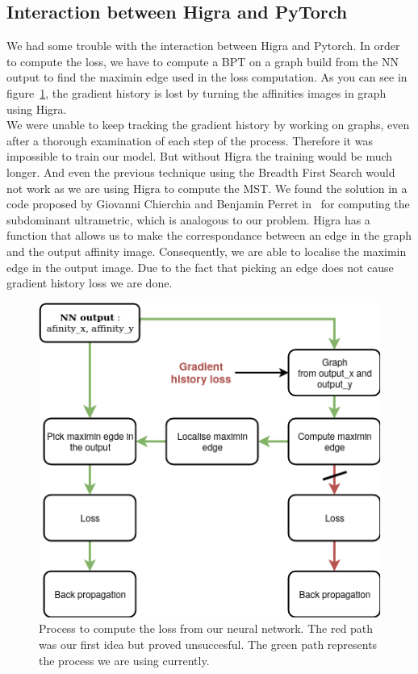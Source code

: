 \subsection{Interaction between Higra and PyTorch}

We had some trouble with the interaction between Higra and Pytorch. In order to
compute the loss, we have to compute a BPT on a graph build from the NN output
to find the maximin edge used in the loss computation. As you can see in
figure~\ref{fig:bpt_method}, the gradient history is lost by turning the
affinities images in graph using Higra.\\
We were unable to keep tracking the gradient history by working on
graphs, even after a thorough examination of each step of the process. 
Therefore it was impossible to train our model. But without Higra the
training would be much longer. And even the previous technique using the
Breadth First Search would not work as we are using Higra to compute the MST.
We found the solution in a code proposed by Giovanni Chierchia and Benjamin
Perret in~\cite{chierchia_ultrametric_2019} for computing the subdominant
ultrametric, which is analogous to our problem. Higra has a function that
allows us to make the correspondance between an edge in the graph and the output
affinity image. Consequently, we are able to localise the maximin edge in the
output image. Due to the fact that picking an edge does not cause gradient
history loss we are done.

\begin{figure}[!htbp]
	\centering
	\includegraphics[width=0.6\linewidth]{./images/gradient_history.png}
	\caption{Process to compute the loss from our neural network. The red path
	was our first idea but proved unsuccesful. The green path represents the
process we are using currently.}
	\label{fig:bpt_method}
\end{figure}


